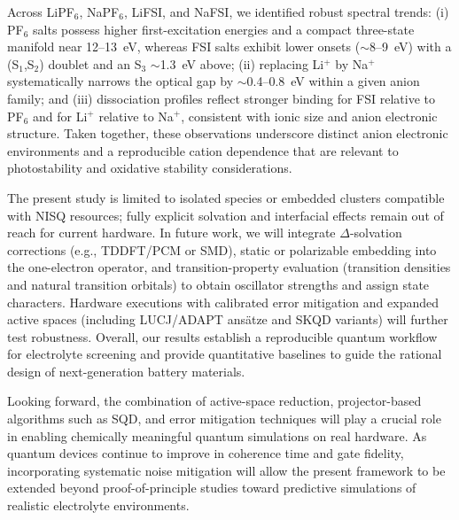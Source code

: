 \documentclass[num-refs]{wiley-article}
\begin{document}
Across LiPF$_6$, NaPF$_6$, LiFSI, and NaFSI, we identified robust spectral trends: (i) PF$_6$ salts possess higher first-excitation energies and a compact three-state manifold near 12--13~eV, whereas FSI salts exhibit lower onsets ($\sim$8--9~eV) with a (S$_1$,S$_2$) doublet and an S$_3$ $\sim$1.3~eV above; (ii) replacing Li$^+$ by Na$^+$ systematically narrows the optical gap by $\sim$0.4--0.8~eV within a given anion family; and (iii) dissociation profiles reflect stronger binding for FSI relative to PF$_6$ and for Li$^+$ relative to Na$^+$, consistent with ionic size and anion electronic structure. Taken together, these observations underscore distinct anion electronic environments and a reproducible cation dependence that are relevant to photostability and oxidative stability considerations.

The present study is limited to isolated species or embedded clusters compatible with NISQ resources; fully explicit solvation and interfacial effects remain out of reach for current hardware. In future work, we will integrate $\Delta$-solvation corrections (e.g., TDDFT/PCM or SMD), static or polarizable embedding into the one-electron operator, and transition-property evaluation (transition densities and natural transition orbitals) to obtain oscillator strengths and assign state characters. Hardware executions with calibrated error mitigation and expanded active spaces (including LUCJ/ADAPT ansätze and SKQD variants) will further test robustness. Overall, our results establish a reproducible quantum workflow for electrolyte screening and provide quantitative baselines to guide the rational design of next-generation battery materials.

Looking forward, the combination of active-space reduction, projector-based algorithms such as SQD, and error mitigation techniques will play a crucial role in enabling chemically meaningful quantum simulations on real hardware. As quantum devices continue to improve in coherence time and gate fidelity, incorporating systematic noise mitigation will allow the present framework to be extended beyond proof-of-principle studies toward predictive simulations of realistic electrolyte environments.


\end{document}
